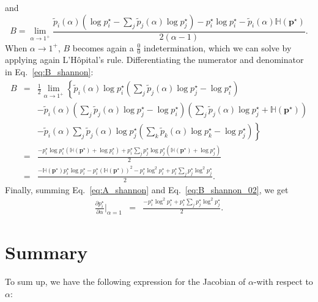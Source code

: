 and
\begin{equation}\label{eq:B_shannon}
    B = \lim_{\alpha \rightarrow 1^+} \frac{\tilde{p}_i(\alpha) (\log p_i^{\star} - \sum_j \tilde{p}_j(\alpha) \log p_j^{\star}) - p_i^{\star}\log p_i^{\star} - \tilde{p}_i(\alpha) \mathbb H(\bm{p}^{\star})}{2(\alpha-1)}.
\end{equation}
When $\alpha\rightarrow 1^+$, $B$ becomes again a $\frac{0}{0}$ indetermination, which we can solve by applying again L'H\^opital's rule. Differentiating the numerator and denominator in Eq.~\ref{eq:B_shannon}:
\begin{eqnarray}\label{eq:B_shannon_02}
    B &=& \frac{1}{2}\lim_{\alpha \rightarrow 1^+} \left\{ \tilde{p}_i(\alpha) \log p_i^{\star} \left(\sum_j \tilde{p}_j(\alpha) \log p_j^{\star} - \log p_i^{\star}\right) \right. \nonumber\\
    && - \tilde{p}_i(\alpha) \left(\sum_j \tilde{p}_j(\alpha) \log p_j^{\star} - \log p_i^{\star}\right) \left(\sum_j \tilde{p}_j(\alpha) \log p_j^{\star} + \mathbb H(\bm{p}^{\star})\right) \nonumber\\
    && \left. - \tilde{p}_i(\alpha) \sum_j \tilde{p}_j(\alpha) \log p_j^{\star} \left(\sum_k \tilde{p}_k(\alpha) \log p_k^{\star} - \log p_j^{\star}\right)\right\}\nonumber\\
    &=& \frac{-p_i^{\star} \log p_i^{\star}(\mathbb H(\bm{p}^{\star}) + \log p_i^{\star})
    +p_i^{\star} \sum_j p_j^{\star} \log p_j^{\star}(\mathbb H(\bm{p}^{\star}) + \log p_j^{\star})}{2}\nonumber\\
    &=& \frac{-\mathbb H(\bm{p}^{\star}) p_i^{\star}\log p_i^{\star} - p_i^{\star} (\mathbb H(\bm{p}^{\star}))^2 - p_i^{\star}\log^2 p_i^{\star} + p_i^{\star} \sum_j p_j^{\star}\log^2 p_j^{\star}}{2}.
\end{eqnarray}
Finally, summing Eq.~\ref{eq:A_shannon} and Eq.~\ref{eq:B_shannon_02}, we get
\begin{eqnarray}\label{eq:gradient_alpha_shannon_02}
    \frac{\partial p_i^{\star}}{\partial \alpha}\bigg|_{\alpha=1} &=& \frac{- p_i^{\star}\log^2 p_i^{\star} + p_i^{\star} \sum_j p_j^{\star}\log^2 p_j^{\star}}{2}.
\end{eqnarray}

\section*{Summary}

To sum up, we have the following expression for the Jacobian of $\alpha$-\entmaxtext with respect to $\alpha$:

